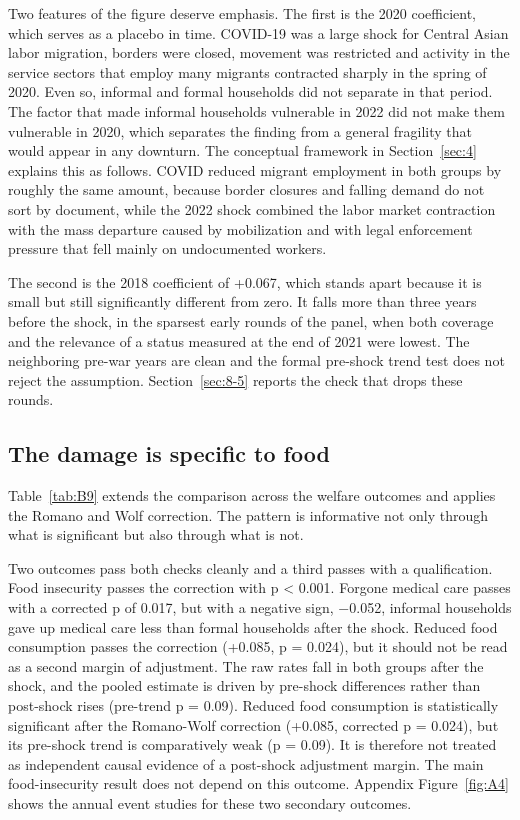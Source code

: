 Two features of the figure deserve emphasis. The first is the 2020 coefficient, which serves as a placebo in time. COVID-19 was a large shock for Central Asian labor migration, borders were closed, movement was restricted and activity in the service sectors that employ many migrants contracted sharply in the spring of 2020. Even so, informal and formal households did not separate in that period. The factor that made informal households vulnerable in 2022 did not make them vulnerable in 2020, which separates the finding from a general fragility that would appear in any downturn. The conceptual framework in Section~\ref{sec:4} explains this as follows. COVID reduced migrant employment in both groups by roughly the same amount, because border closures and falling demand do not sort by document, while the 2022 shock combined the labor market contraction with the mass departure caused by mobilization and with legal enforcement pressure that fell mainly on undocumented workers.

The second is the 2018 coefficient of +0.067, which stands apart because it is small but still significantly different from zero. It falls more than three years before the shock, in the sparsest early rounds of the panel, when both coverage and the relevance of a status measured at the end of 2021 were lowest. The neighboring pre-war years are clean and the formal pre-shock trend test does not reject the assumption. Section~\ref{sec:8-5} reports the check that drops these rounds.

\subsection{The damage is specific to food}\label{sec:7-3}

Table~\ref{tab:B9} extends the comparison across the welfare outcomes and applies the Romano and Wolf correction. The pattern is informative not only through what is significant but also through what is not.

Two outcomes pass both checks cleanly and a third passes with a qualification. Food insecurity passes the correction with p < 0.001. Forgone medical care passes with a corrected p of 0.017, but with a negative sign, $-$0.052, informal households gave up medical care less than formal households after the shock. Reduced food consumption passes the correction (+0.085, p = 0.024), but it should not be read as a second margin of adjustment. The raw rates fall in both groups after the shock, and the pooled estimate is driven by pre-shock differences rather than post-shock rises (pre-trend p = 0.09). Reduced food consumption is statistically significant after the Romano-Wolf correction (+0.085, corrected p = 0.024), but its pre-shock trend is comparatively weak (p = 0.09). It is therefore not treated as independent causal evidence of a post-shock adjustment margin. The main food-insecurity result does not depend on this outcome. Appendix Figure~\ref{fig:A4} shows the annual event studies for these two secondary outcomes.

